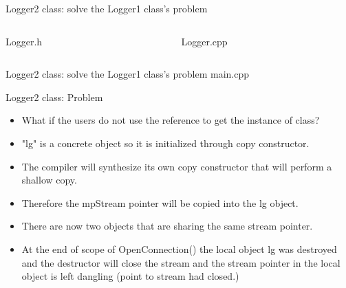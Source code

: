 \documentclass[13pt]{beamer}
\begin{document}
\begin{frame}{Logger2 class: solve the Logger1 class's problem}
\begin{columns}[T]
\begin{column}{.48\textwidth}
Logger.h
\lstset{basicstyle=\tiny,style=myCustomCppStyle}

\end{column}

\begin{column}{.48\textwidth}
Logger.cpp
\lstset{basicstyle=\tiny,style=myCustomCppStyle}

\end{column}
\end{columns}
\end{frame}

\begin{frame}{Logger2 class: solve the Logger1 class's problem}
main.cpp
\lstset{basicstyle=\tiny,style=myCustomCppStyle}

\end{frame}

\begin{frame}{Logger2 class: Problem}
\begin{itemize}
\setlength\itemsep{1em}

\item What if the users do not use the reference to get the instance of class?

\item "lg" is a concrete object so it is initialized through copy constructor.

\item The compiler will synthesize its own copy constructor that will perform a shallow copy.

\item Therefore the mpStream pointer will be copied into the lg object.

\item There are now two objects that are sharing the same stream pointer.

\item At the end of scope of OpenConnection() the local object lg was         
    destroyed and the destructor will close the stream and the stream       
    pointer in the local object is left dangling (point to stream had       
    closed.)
\end{itemize}
\end{frame}
\end{document}
